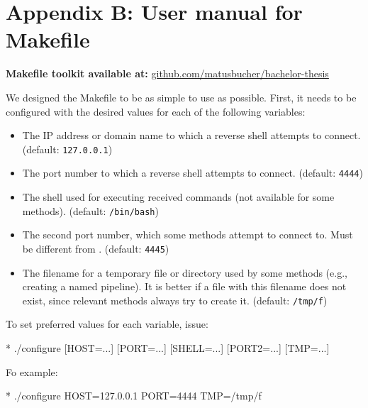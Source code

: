 \newcommand{\target}{\textcolor{placeholder}{\texttt{$\langle$target$\rangle$}}}

\chapter*{Appendix B: User manual for Makefile}

\textbf{Makefile toolkit available at:} \href{https://github.com/matusbucher/bachelor-thesis}{github.com/matusbucher/bachelor-thesis}

\vspace{15pt}

We designed the Makefile to be as simple to use as possible. First, it needs to be configured with the desired values for each of the following variables:

\setlength{\leftmargini}{5em}
\begin{itemize}
\item[\host] The IP address or domain name to which a reverse shell attempts to connect. (default: \texttt{127.0.0.1})
\item[\port] The port number to which a reverse shell attempts to connect. (default: \texttt{4444})
\item[\shell] The shell used for executing received commands (not available for some methods). (default: \texttt{/bin/bash})
\item[\portt] The second port number, which some methods attempt to connect to. Must be different from \port. (default: \texttt{4445})
\item[\tmp] The filename for a temporary file or directory used by some methods (e.g., creating a named pipeline). It is better if a file with this filename does not exist, since relevant methods always try to create it. (default: \texttt{/tmp/f})
\end{itemize}
\setlength{\leftmargini}{2.5em}

To set preferred values for each variable, issue:

\begin{cmdline}{*}{}{}
./configure [HOST=...] [PORT=...] [SHELL=...] [PORT2=...] [TMP=...]
\end{cmdline}

Fo example:

\begin{cmdline}{*}{}{}
./configure HOST=127.0.0.1 PORT=4444 TMP=/tmp/f
\end{cmdline}

